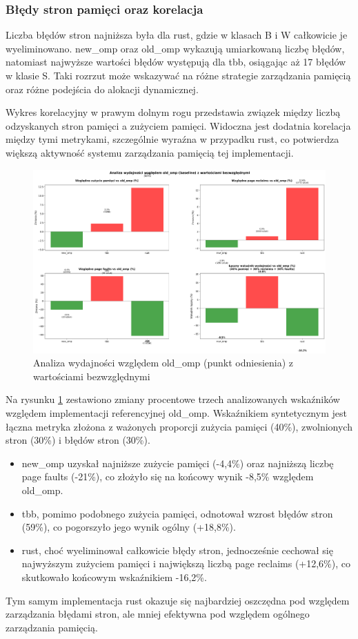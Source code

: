 \subsubsection{Błędy stron pamięci oraz korelacja}
Liczba błędów stron najniższa była dla rust, gdzie w klasach B i W całkowicie je wyeliminowano. new\_omp oraz old\_omp wykazują umiarkowaną liczbę błędów, natomiast najwyższe wartości błędów występują dla tbb, osiągając aż 17 błędów w klasie S. Taki rozrzut może wskazywać na różne strategie zarządzania pamięcią oraz różne podejścia do alokacji dynamicznej.

Wykres korelacyjny w prawym dolnym rogu przedstawia związek między liczbą odzyskanych stron pamięci a zużyciem pamięci. Widoczna jest dodatnia korelacja między tymi metrykami, szczególnie wyraźna w przypadku rust, co potwierdza większą aktywność systemu zarządzania pamięcią tej implementacji.

\begin{figure}[H]
    \centering
    \includegraphics[width=\textwidth]{analiza/images/parallel/ep/chart_05_performance_ratios.png}
    \caption{Analiza wydajności względem old\_omp (punkt odniesienia) z wartościami bezwzględnymi}
    \label{ep_analiza_wzgledem_old_omp}
\end{figure}
Na rysunku \ref{ep_analiza_wzgledem_old_omp} zestawiono zmiany procentowe trzech analizowanych wskaźników względem implementacji referencyjnej old\_omp. Wskaźnikiem syntetycznym jest łączna metryka złożona z ważonych proporcji zużycia pamięci (40\%), zwolnionych stron (30\%) i błędów stron (30\%).
\begin{itemize}
    \item new\_omp uzyskał najniższe zużycie pamięci (-4,4\%) oraz najniższą liczbę page faults (-21\%), co złożyło się na końcowy wynik -8,5\% względem old\_omp.
    \item tbb, pomimo podobnego zużycia pamięci, odnotował wzrost błędów stron (59\%), co pogorszyło jego wynik ogólny (+18,8\%).
    \item rust, choć wyeliminował całkowicie błędy stron, jednocześnie cechował się najwyższym zużyciem pamięci i największą liczbą page reclaims (+12,6\%), co skutkowało końcowym wskaźnikiem -16,2\%.
\end{itemize}
Tym samym implementacja rust okazuje się najbardziej oszczędna pod względem zarządzania błędami stron, ale mniej efektywna pod względem ogólnego zarządzania pamięcią.




